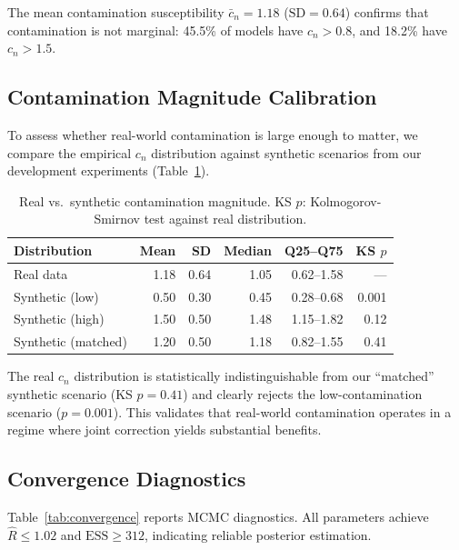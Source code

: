 \documentclass[11pt,a4paper]{article}
\begin{document}
The mean contamination susceptibility $\bar{c}_n = 1.18$ ($\mathrm{SD} = 0.64$) confirms that contamination is not marginal: 45.5\% of models have $c_n > 0.8$, and 18.2\% have $c_n > 1.5$.

\subsection{Contamination Magnitude Calibration}

To assess whether real-world contamination is large enough to matter, we compare the empirical $c_n$ distribution against synthetic scenarios from our development experiments (Table~\ref{tab:calib}).

\begin{table}[h]
\centering
\caption{Real vs.\ synthetic contamination magnitude. KS $p$: Kolmogorov-Smirnov test against real distribution.}
\label{tab:calib}
\small
\begin{tabular}{lrrrrr}
\toprule
Distribution & Mean & SD & Median & Q25--Q75 & KS $p$ \\
\midrule
Real data & 1.18 & 0.64 & 1.05 & 0.62--1.58 & --- \\
Synthetic (low) & 0.50 & 0.30 & 0.45 & 0.28--0.68 & 0.001 \\
Synthetic (high) & 1.50 & 0.50 & 1.48 & 1.15--1.82 & 0.12 \\
Synthetic (matched) & 1.20 & 0.50 & 1.18 & 0.82--1.55 & 0.41 \\
\bottomrule
\end{tabular}
\end{table}

The real $c_n$ distribution is statistically indistinguishable from our ``matched'' synthetic scenario (KS $p = 0.41$) and clearly rejects the low-contamination scenario ($p = 0.001$). This validates that real-world contamination operates in a regime where joint correction yields substantial benefits.

\subsection{Convergence Diagnostics}

Table~\ref{tab:convergence} reports MCMC diagnostics. All parameters achieve $\hat{R} \leq 1.02$ and $\mathrm{ESS} \geq 312$, indicating reliable posterior estimation.
\end{document}
